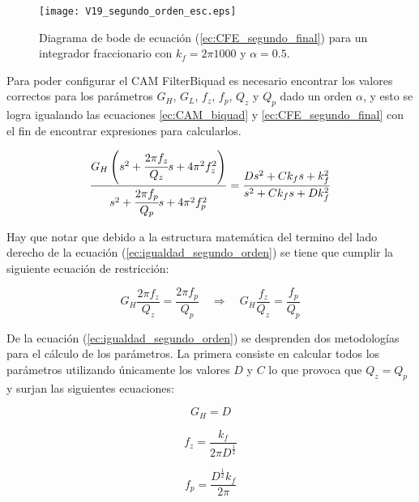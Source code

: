 	\begin{figure}[hbtp]
		\caption{Diagrama de bode de ecuación (\ref{ec:CFE_segundo_final}) para un integrador fraccionario con $k_{f} = 2\pi 1000$ y  $\alpha = 0.5$.} 
		\label{fig:V19_segundo_orden_esc}
		\centering
		\texttt{[image: V19\_segundo\_orden\_esc.eps]}
	\end{figure}
	
	Para poder configurar el CAM FilterBiquad es necesario encontrar los valores correctos para los parámetros $G_{H}$, $G_{L}$, $f_{z}$, $f_{p}$, $Q_{z}$ y $Q_{p}$ dado un orden $\alpha$, y esto se logra igualando las ecuaciones \ref{ec:CAM_biquad} y \ref{ec:CFE_segundo_final} con el fin de encontrar expresiones para calcularlos.
	
	\begin{equation}
		\frac{G_{H} \left(  s^{2} + \cfrac{2 \pi f_{z}}{Q_{z}} s + 4 \pi^{2} f_{z}^{2} \right)}{s^{2} + \cfrac{2 \pi f_{p}}{Q_{p}}s + 4\pi^{2} f_{p}^{2} } = \frac{D s^{2} + C k_{f}s + k_{f}^{2}}{s^{2} + C k_{f}s + Dk_{f}^{2}}
		\label{ec:igualdad_segundo_orden}
	\end{equation}
		
	Hay que notar que debido a la estructura matemática del termino del lado derecho de la ecuación (\ref{ec:igualdad_segundo_orden}) se tiene que cumplir la siguiente ecuación de restricción:
		
	\begin{equation}
		G_{H} \frac{2 \pi f_{z}}{Q_{z}} = \frac{2 \pi f_{p}}{Q_{p}} \quad \Rightarrow \quad  G_{H} \frac{f_{z}}{Q_{z}} = \frac{f_{p}}{Q_{p}}
	\end{equation}
		
	De la ecuación (\ref{ec:igualdad_segundo_orden}) se desprenden dos metodologías para el cálculo de los parámetros. La primera consiste en calcular todos los parámetros utilizando únicamente los valores $D$ y $C$ lo que provoca que $Q_{z} = Q_{p}$ y surjan las siguientes ecuaciones:
		
	\begin{equation}
		G_{H} = D
	\end{equation}
	
	\begin{equation}
		f_{z} = \frac{k_{f}}{2 \pi D^{\frac{1}{2}}}
	\end{equation}
	
	\begin{equation}
		f_{p} = \frac{D^{\frac{1}{2}} k_{f}}{2 \pi}
	\end{equation}
	
